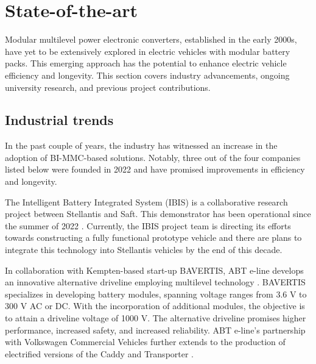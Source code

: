 \documentclass{article}
\begin{document}
\section{State-of-the-art}
Modular multilevel power electronic converters, established in the early 2000s, have yet to be extensively explored in electric vehicles with modular battery packs. This emerging approach has the potential to enhance electric vehicle efficiency and longevity. This section covers industry advancements, ongoing university research, and previous project contributions. %

\subsection{Industrial trends}
In the past couple of years, the industry has witnessed an increase in the adoption of BI-MMC-based solutions. Notably, three out of the four companies listed below were founded in 2022 and have promised improvements in efficiency and longevity.    

The Intelligent Battery Integrated System (IBIS) is a collaborative research project between Stellantis and Saft. This demonstrator has been operational since the summer of 2022 \cite{ChargedEVs}. Currently, the IBIS project team is directing its efforts towards constructing a fully functional prototype vehicle and there are plans to integrate this technology into Stellantis vehicles by the end of this decade. 

In collaboration with Kempten-based start-up BAVERTIS, ABT e-line develops an innovative alternative driveline employing multilevel technology \cite{ABTSportsline}. BAVERTIS specializes in developing battery modules, spanning voltage ranges from 3.6 V to 300 V AC or DC. With the incorporation of additional modules, the objective is to attain a driveline voltage of 1000 V. The alternative driveline promises higher performance, increased safety, and increased reliability. ABT e-line's partnership with Volkswagen Commercial Vehicles further extends to the production of electrified versions of the Caddy and Transporter \cite{ABTeline}. 
\end{document}
